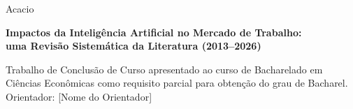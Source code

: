 
\begin{center}
\large
Acacio

\vspace{2cm}

\textbf{Impactos da Inteligência Artificial no Mercado de Trabalho:\\
uma Revisão Sistemática da Literatura (2013--2026)}

\vspace{1cm}

\normalsize
Trabalho de Conclusão de Curso apresentado ao curso de Bacharelado em Ciências
Econômicas como requisito parcial para obtenção do grau de Bacharel.\\[1em]
Orientador: [Nome do Orientador]
\end{center}
\vspace*{\fill}
\newpage
